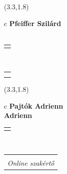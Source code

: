 \documentclass[11pt]{article}
\begin{document}
\makebox(3.3,1.8){
  \renewcommand\arraystretch{1.3}
  \begin{tabular}[c]{c}
    \hspace{8.5mm}
    \LARGE\bf{ Pfeiffer Szilárd }\\
    \hspace{8.5mm}
    \Large{  }\\
    \renewcommand\arraystretch{3}
    \begin{tabular}[c]{c}
      \centering
      \fontfamily{phv}\selectfont{
        \textbf{
          \textsc{
            \scriptsize{
            \color{Dark}{ Ismerkedő }\color{Bright}{ Webmester }\color{Bright}{ Sminkmester }\color{Bright}{ Programozó }
            }
          }
        }
      }
    \end{tabular}
    \\
    \renewcommand\arraystretch{1}
    \begin{tabular}{p{3.3in}}
      \hspace{.7cm}\\
      \hspace{.7cm}\emph{  }\\
    \end{tabular}
  \end{tabular}
}

\makebox(3.3,1.8){
  \renewcommand\arraystretch{1.3}
  \begin{tabular}[c]{c}
    \hspace{8.5mm}
    \LARGE\bf{ Pajtók Adrienn }\\
    \hspace{8.5mm}
    \Large{ Adrienn }\\
    \renewcommand\arraystretch{3}
    \begin{tabular}[c]{c}
      \centering
      \fontfamily{phv}\selectfont{
        \textbf{
          \textsc{
            \scriptsize{
            \color{Bright}{ Ismerkedő }\color{Dark}{ Webmester }\color{Bright}{ Sminkmester }\color{Bright}{ Programozó }
            }
          }
        }
      }
    \end{tabular}
    \\
    \renewcommand\arraystretch{1}
    \begin{tabular}{p{3.3in}}
      \hspace{.7cm}\\
      \hspace{.7cm}\emph{ Online szakértő }\\
    \end{tabular}
  \end{tabular}
}
\end{document}
